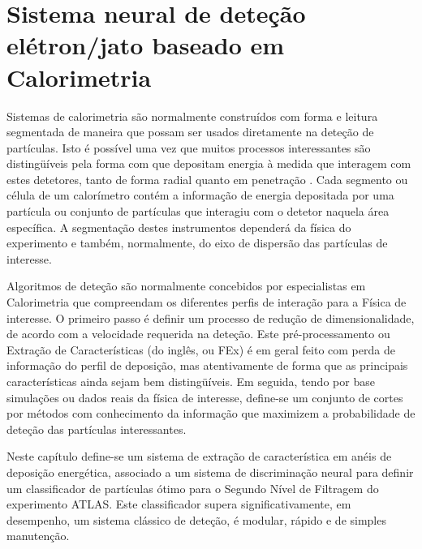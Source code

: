 \typeout{ ====================================================================}
\typeout{ ====================================================================}

\chapter{Sistema neural de deteção elétron/jato baseado em Calorimetria}
\label{chap:neural}

Sistemas de calorimetria são normalmente construídos com forma e leitura
segmentada de maneira que possam ser usados diretamente na deteção de
partículas. Isto é possível uma vez que muitos processos interessantes são
distingüíveis pela forma com que depositam energia à medida que interagem com
estes detetores, tanto de forma radial quanto em penetração
\cite{wigmans-book}. Cada segmento ou célula de um calorímetro contém a
informação de energia depositada por uma partícula ou conjunto de partículas
que interagiu com o detetor naquela área específica. A segmentação destes
instrumentos dependerá da física do experimento e também, normalmente, do eixo
de dispersão das partículas de interesse.

Algoritmos de dete\-ção são normalmente concebidos por especialistas em
Calorimetria que compreendam os diferentes perfis de intera\-ção para a Fí\-sica
de interesse. O primeiro passo é definir um processo de redu\-ção de
dimensionalidade, de acordo com a velocidade requerida na deteção. Este
pré-processamento ou Extração de Características (do inglês,  ou FEx) é em geral feito com perda de informação do perfil de
deposição, mas atentivamente de forma que as principais características ainda
sejam bem distingüíveis. Em seguida, tendo por base simulações ou dados reais
da física de interesse, define-se um conjunto de cortes por métodos com
conhecimento da informação  que maximizem a probabilidade de
deteção das partículas interessantes.

Neste capítulo define-se um sistema de extração de característica em anéis de
deposição energética, associado a um sistema de discriminação neural para
definir um classificador de partículas ótimo para o Segundo Nível de Filtragem
do experimento ATLAS. Este classificador supera significativamente, em
desempenho, um sistema clássico de deteção, é modular, rápido e de simples
manutenção.

